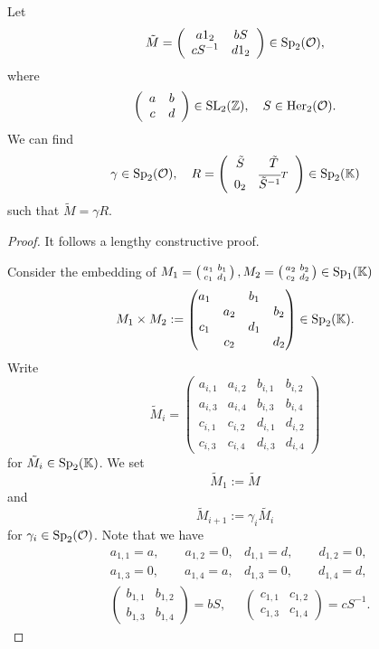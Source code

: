 \begin{lemma}[$solveR$]
\label{lemma:solveR}
\label{solveR}
\label{impl:solveR}
Let
\[ \tilde{M} = \left( \begin{array}{cc} a 1_2 & b S \\ c S^{-1} & d 1_2 \end{array} \right) \in \operatorname{Sp}_2(\mathcal{O}) , \]
where
\[ \left( \begin{array}{cc} a & b \\ c & d \end{array} \right) \in \operatorname{SL}_2(\mathbb{Z}), \quad S \in \operatorname{Her}_2(\mathcal{O}) . \]
We can find
\[ \gamma \in \operatorname{Sp}_2(\mathcal{O}), \quad R = \left( \begin{array}{cc} \tilde{S} & \tilde{T} \\ 0_2 & \overline{\tilde{S}^{-1}}^T \end{array} \right) \in \operatorname{Sp}_2(\mathbb{K}) \]
such that $\tilde{M} = \gamma R$.
\begin{proof}
It follows a lengthy constructive proof.

Consider the embedding of $M_1 = \left( \begin{smallmatrix} a_1 & b_1 \\ c_1 & d_1 \end{smallmatrix} \right), M_2 = \left( \begin{smallmatrix} a_2 & b_2 \\ c_2 & d_2 \end{smallmatrix} \right) \in \operatorname{Sp}_1(\mathbb{K})$
\[ M_1 \times M_2 := \begin{pmatrix}
a_1 & & b_1 & \\
& a_2 & & b_2 \\
c_1 & & d_1 & \\
& c_2 & & d_2
\end{pmatrix} \in \operatorname{Sp}_2(\mathbb{K}). \]
Write
\[ \tilde{M}_i = \begin{pmatrix}
a_{i,1} & a_{i,2} & b_{i,1} & b_{i,2} \\
a_{i,3} & a_{i,4} & b_{i,3} & b_{i,4} \\
c_{i,1} & c_{i,2} & d_{i,1} & d_{i,2} \\
c_{i,3} & c_{i,4} & d_{i,3} & d_{i,4}
\end{pmatrix} \]
for $\tilde{M}_i \in \operatorname{Sp}_2(\mathbb{K})$.
We set
\[ \tilde{M}_1 := \tilde{M} \]
and
\[ \tilde{M}_{i+1} := \gamma_i \tilde{M_i} \]
for $\gamma_i \in \operatorname{Sp}_2(\mathcal{O})$.
Note that we have
\begin{align*}
&a_{1,1} = a, \quad \quad a_{1,2} = 0,
&d_{1,1} = d, \quad \quad d_{1,2} = 0, \\
&a_{1,3} = 0, \quad \quad a_{1,4} = a,
&d_{1,3} = 0, \quad \quad d_{1,4} = d, \\
&\begin{pmatrix}
b_{1,1} & b_{1,2} \\
b_{1,3} & b_{1,4}
\end{pmatrix} = bS ,
& \begin{pmatrix}
c_{1,1} & c_{1,2} \\
c_{1,3} & c_{1,4}
\end{pmatrix} = cS^{-1} .
\end{align*}


\end{proof}
\end{lemma}
